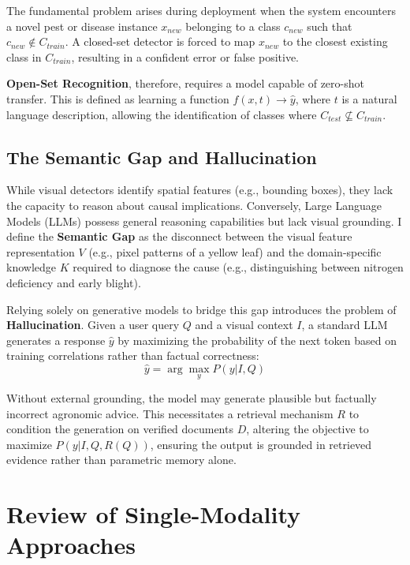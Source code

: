 The fundamental problem arises during deployment when the system encounters a novel pest or disease instance $x_{new}$ belonging to a class $c_{new}$ such that $c_{new} \notin C_{train}$. A closed-set detector is forced to map $x_{new}$ to the closest existing class in $C_{train}$, resulting in a confident error or false positive.

\textbf{Open-Set Recognition}, therefore, requires a model capable of zero-shot transfer. This is defined as learning a function $f(x, t) \rightarrow \hat{y}$, where $t$ is a natural language description, allowing the identification of classes where $C_{test} \not\subseteq C_{train}$.

\subsection{The Semantic Gap and Hallucination}
While visual detectors identify spatial features (e.g., bounding boxes), they lack the capacity to reason about causal implications. Conversely, Large Language Models (LLMs) possess general reasoning capabilities but lack visual grounding. I define the \textbf{Semantic Gap} as the disconnect between the visual feature representation $V$ (e.g., pixel patterns of a yellow leaf) and the domain-specific knowledge $K$ required to diagnose the cause (e.g., distinguishing between nitrogen deficiency and early blight).

Relying solely on generative models to bridge this gap introduces the problem of \textbf{Hallucination}. Given a user query $Q$ and a visual context $I$, a standard LLM generates a response $\hat{y}$ by maximizing the probability of the next token based on training correlations rather than factual correctness:
\[ \hat{y} = \arg\max_y P(y | I, Q) \]

Without external grounding, the model may generate plausible but factually incorrect agronomic advice. This necessitates a retrieval mechanism $R$ to condition the generation on verified documents $D$, altering the objective to maximize $P(y | I, Q, R(Q))$, ensuring the output is grounded in retrieved evidence rather than parametric memory alone.

%
%
\section{Review of Single-Modality Approaches}


